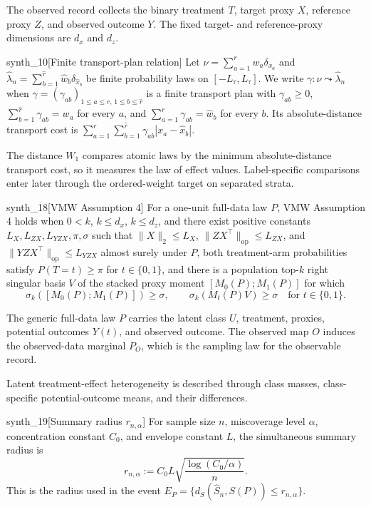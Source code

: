 \documentclass[11pt]{article}
\begin{document}
The observed record collects the binary treatment \(T\), target proxy \(X\), reference proxy \(Z\), and observed outcome \(Y\). The fixed target- and reference-proxy dimensions are \(d_x\) and \(d_z\).

\begin{definitionv}{synth_10}[Finite transport-plan relation]
Let \(\nu=\sum_{a=1}^r w_a\delta_{x_a}\) and \(\widehat\lambda_n=\sum_{b=1}^{\widehat r}\widehat w_b\delta_{\widehat x_b}\) be finite probability laws on \([-L_\tau,L_\tau]\). We write \(\gamma:\nu\leadsto\widehat\lambda_n\) when \(\gamma=(\gamma_{ab})_{1\le a\le r,\,1\le b\le\widehat r}\) is a finite transport plan with \(\gamma_{ab}\ge0\), \(\sum_{b=1}^{\widehat r}\gamma_{ab}=w_a\) for every \(a\), and \(\sum_{a=1}^{r}\gamma_{ab}=\widehat w_b\) for every \(b\). Its absolute-distance transport cost is \(\sum_{a=1}^{r}\sum_{b=1}^{\widehat r}\gamma_{ab}|x_a-\widehat x_b|\).
\end{definitionv}

The distance \(W_1\) compares atomic laws by the minimum absolute-distance transport cost, so it measures the law of effect values. Label-specific comparisons enter later through the ordered-weight target on separated strata.

\begin{definitionv}{synth_18}[VMW Assumption 4]
For a one-unit full-data law \(P\), VMW Assumption 4 holds when \(0<k\), \(k\le d_x\), \(k\le d_z\), and there exist positive constants \(L_X,L_{ZX},L_{YZX},\pi,\sigma\) such that \(\|X\|_2\le L_X\), \(\|ZX^\top\|_{\mathrm{op}}\le L_{ZX}\), and \(\|YZX^\top\|_{\mathrm{op}}\le L_{YZX}\) almost surely under \(P\), both treatment-arm probabilities satisfy \(P(T=t)\ge\pi\) for \(t\in\{0,1\}\), and there is a population top-\(k\) right singular basis \(V\) of the stacked proxy moment \([M_0(P);M_1(P)]\) for which
\[
\sigma_k([M_0(P);M_1(P)])\ge\sigma,
\qquad
\sigma_k(M_t(P)V)\ge\sigma\quad\text{for }t\in\{0,1\}.
\]
\end{definitionv}

The generic full-data law \(P\) carries the latent class \(U\), treatment, proxies, potential outcomes \(Y(t)\), and observed outcome. The observed map \(O\) induces the observed-data marginal \(P_O\), which is the sampling law for the observable record.

Latent treatment-effect heterogeneity is described through class masses, class-specific potential-outcome means, and their differences.

\begin{definitionv}{synth_19}[Summary radius \(r_{n,\alpha}\)]
For sample size \(n\), miscoverage level \(\alpha\), concentration constant \(C_0\), and envelope constant \(L\), the simultaneous summary radius is
\[
r_{n,\alpha}:=C_0L\sqrt{\frac{\log(C_0/\alpha)}{n}}.
\]
This is the radius used in the event \(E_P=\{d_S(\widehat S_n,S(P))\le r_{n,\alpha}\}\).
\end{definitionv}
\end{document}
